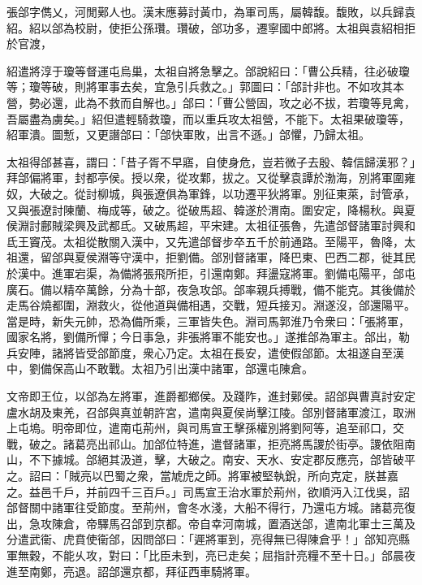 \begin{pinyinscope}
 
 
 張郃字儁乂，河閒鄚人也。漢末應募討黃巾，為軍司馬，屬韓馥。馥敗，以兵歸袁紹。紹以郃為校尉，使拒公孫瓚。瓚破，郃功多，遷寧國中郎將。太祖與袁紹相拒於官渡，
 
 
 紹遣將淳于瓊等督運屯烏巢，太祖自將急擊之。郃說紹曰：「曹公兵精，往必破瓊等；瓊等破，則將軍事去矣，宜急引兵救之。」郭圖曰：「郃計非也。不如攻其本營，勢必還，此為不救而自解也。」郃曰：「曹公營固，攻之必不拔，若瓊等見禽，吾屬盡為虜矣。」紹但遣輕騎救瓊，而以重兵攻太祖營，不能下。太祖果破瓊等，紹軍潰。圖慙，又更譖郃曰：「郃快軍敗，出言不遜。」郃懼，乃歸太祖。
 
 
太祖得郃甚喜，謂曰：「昔子胥不早寤，自使身危，豈若微子去殷、韓信歸漢邪？」拜郃偏將軍，封都亭侯。授以衆，從攻鄴，拔之。又從擊袁譚於渤海，別將軍圍雍奴，大破之。從討柳城，與張遼俱為軍鋒，以功遷平狄將軍。別征東萊，討管承，又與張遼討陳蘭、梅成等，破之。從破馬超、韓遂於渭南。圍安定，降楊秋。與夏侯淵討鄜賊梁興及武都氐。又破馬超，平宋建。太祖征張魯，先遣郃督諸軍討興和氐王竇茂。太祖從散關入漢中，又先遣郃督步卒五千於前通路。至陽平，魯降，太祖還，留郃與夏侯淵等守漢中，拒劉備。郃別督諸軍，降巴東、巴西二郡，徙其民於漢中。進軍宕渠，為備將張飛所拒，引還南鄭。拜盪寇將軍。劉備屯陽平，郃屯廣石。備以精卒萬餘，分為十部，夜急攻郃。郃率親兵搏戰，備不能克。其後備於走馬谷燒都圍，淵救火，從他道與備相遇，交戰，短兵接刃。淵遂沒，郃還陽平。
 當是時，新失元帥，恐為備所乘，三軍皆失色。淵司馬郭淮乃令衆曰：「張將軍，國家名將，劉備所憚；今日事急，非張將軍不能安也。」遂推郃為軍主。郃出，勒兵安陣，諸將皆受郃節度，衆心乃定。太祖在長安，遣使假郃節。太祖遂自至漢中，劉備保高山不敢戰。太祖乃引出漢中諸軍，郃還屯陳倉。
 
 
 
 
 文帝即王位，以郃為左將軍，進爵都鄉侯。及踐阼，進封鄚侯。詔郃與曹真討安定盧水胡及東羌，召郃與真並朝許宮，遣南與夏侯尚擊江陵。郃別督諸軍渡江，取洲上屯塢。明帝即位，遣南屯荊州，與司馬宣王擊孫權別將劉阿等，追至祁口，交戰，破之。諸葛亮出祁山。加郃位特進，遣督諸軍，拒亮將馬謖於街亭。謖依阻南山，不下據城。郃絕其汲道，擊，大破之。南安、天水、安定郡反應亮，郃皆破平之。詔曰：「賊亮以巴蜀之衆，當虓虎之師。將軍被堅執銳，所向克定，朕甚嘉之。益邑千戶，并前四千三百戶。」司馬宣王治水軍於荊州，欲順沔入江伐吳，詔郃督關中諸軍往受節度。至荊州，會冬水淺，大船不得行，乃還屯方城。諸葛亮復出，急攻陳倉，帝驛馬召郃到京都。帝自幸河南城，置酒送郃，遣南北軍士三萬及分遣武衞、虎賁使衞郃，因問郃曰：「遲將軍到，亮得無已得陳倉乎！」郃知亮縣軍無穀，不能乆攻，對曰：「比臣未到，亮已走矣；屈指計亮糧不至十日。」郃晨夜進至南鄭，亮退。詔郃還京都，拜征西車騎將軍。
 

\end{pinyinscope}
